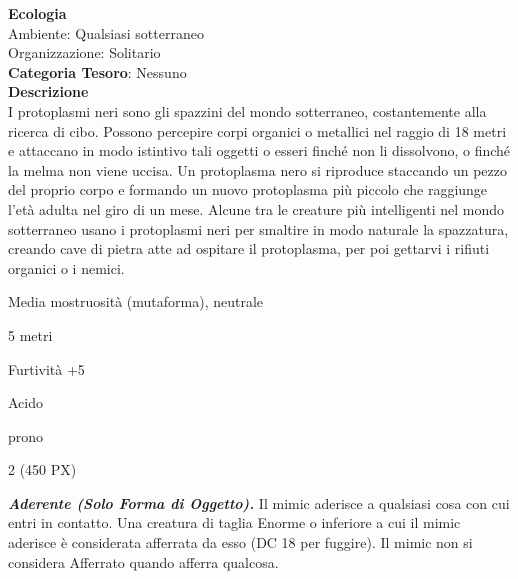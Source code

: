 \begin{multicols}{2}
{\textbf{Ecologia}\\
Ambiente: Qualsiasi sotterraneo\\
Organizzazione: Solitario\\
\textbf{Categoria Tesoro}: Nessuno\\
\textbf{Descrizione}\\
I protoplasmi neri sono gli spazzini del mondo sotterraneo, costantemente alla ricerca di cibo. Possono percepire corpi organici o metallici nel raggio di 18 metri e attaccano in modo istintivo tali oggetti o esseri finché non li dissolvono, o finché la melma non viene uccisa. Un protoplasma nero si riproduce staccando un pezzo del proprio corpo e formando un nuovo protoplasma più piccolo che raggiunge l'età adulta nel giro di un mese. Alcune tra le creature più intelligenti nel mondo sotterraneo usano i protoplasmi neri per smaltire in modo naturale la spazzatura, creando cave di pietra atte ad ospitare il protoplasma, per poi gettarvi i rifiuti organici o i nemici.

\begin{description}[noitemsep, topsep=0pt, parsep=0pt, partopsep=0pt, itemsep=1pt, leftmargin=2.35cm,  labelwidth=2.2cm, itemindent=0cm, listparindent=0pt] %
\setlength{\baselineskip}{10pt}
\item[\textbf{Taglia/Tipo}] Media mostruosità (mutaforma), neutrale
\item[\textbf{Caratt.}] 
\item[\textbf{Punti Ferita}] 
\item[\textbf{Movimento}] 5 metri
\item[\textbf{Tiri Salvez.}] 
\item[\textbf{Comp.}] Furtività +5
\item[\textbf{Imm. Danni}] Acido
\item[\textbf{Immunità}] prono
\item[\textbf{Sensi}] 
\item[\textbf{Sfida}] 2 (450 PX)
\end{description}
\smallskip

\emph{\textbf{Aderente (Solo Forma di Oggetto).}} Il mimic aderisce a qualsiasi cosa con cui entri in contatto. Una creatura di taglia Enorme o inferiore a cui il mimic aderisce è considerata afferrata da esso (DC 18 per fuggire). Il mimic non si considera Afferrato quando afferra qualcosa.

}
\end{multicols}
